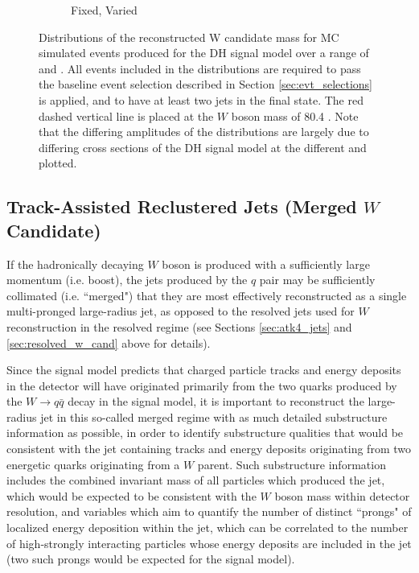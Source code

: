 \begin{figure}[h]
\begin{subfigure}[b]{0.49\textwidth}
	\caption{\ms Fixed, \mZp Varied}
	\label{fig:resolved_Wmass_reco_mZp}
	\end{subfigure}
	\caption[]{Distributions of the reconstructed W candidate mass for MC simulated events produced for the DH signal model over a range of \ms and \mZp. All events included in the distributions are required to pass the baseline event selection described in Section \ref{sec:evt_selections} is applied, and to have at least two \SmallR jets in the final state. The red dashed vertical line is placed at the \(W\) boson mass of 80.4 \GeV. Note that the differing amplitudes of the distributions are largely due to differing cross sections of the DH signal model at the different \ms and \mZp plotted.}
	\label{fig:resolved_Wmass_reco}
\end{figure}

\subsection{Track-Assisted Reclustered Jets (Merged \(W\) Candidate)}

If the hadronically decaying \(W\) boson is produced with a sufficiently large momentum (i.e. boost), the jets produced by the \(q\) pair may be sufficiently collimated (i.e. ``merged") that they are most effectively reconstructed as a single multi-pronged large-radius jet, as opposed to the resolved \SmallR jets used for \(W\) reconstruction in the resolved regime (see Sections \ref{sec:atk4_jets} and \ref{sec:resolved_w_cand} above for details). 

Since the signal model predicts that charged particle tracks and energy deposits in the detector will have originated primarily from the two quarks produced by the \(W\rightarrow q\bar{q}\) decay in the signal model, it is important to reconstruct the large-radius jet in this so-called merged regime with as much detailed substructure information as possible, in order to identify substructure qualities that would be consistent with the jet containing tracks and energy deposits originating from two energetic quarks originating from a \(W\) parent. Such substructure information includes the combined invariant mass of all particles which produced the jet, which would be expected to be consistent with the \(W\) boson mass within detector resolution, and variables which aim to quantify the number of distinct ``prongs" of localized energy deposition within the jet, which can be correlated to the number of high-\pt strongly interacting particles whose energy deposits are included in the jet (two such prongs would be expected for the signal model). 

